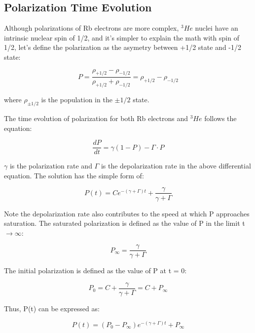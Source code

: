 \subsection{Polarization Time Evolution}

Although polarizations of Rb electrons are more complex, $^{3}He$ nuclei have an intrinsic nuclear spin of 1/2, and it's simpler to explain the math with spin of 1/2, let's define the polarization as the asymetry between +1/2 state and -1/2 state:

\begin{equation}
P=\frac{\rho_{+1/2}-\rho_{-1/2}}{\rho_{+1/2}+\rho_{-1/2}}=\rho_{+1/2}-\rho_{-1/2}
\end{equation}

where $\rho_{\pm 1/2}$ is the population in the $\pm1/2$ state.

The time evolution of polarization for both Rb electrons and $^{3}He$ follows the equation:

\begin{equation}
\frac{dP}{dt}=\gamma(1-P)-\Gamma \cdot P
\end{equation}

$\gamma$ is the polarization rate and $\Gamma$ is the depolarization rate in the above differential equation. The solution has the simple form of:

\begin{equation}
P(t)=Ce^{-(\gamma+\Gamma)t} + \frac{\gamma}{\gamma+\Gamma}
\end{equation}

Note the depolarization rate also contributes to the speed at which P approaches saturation. The saturated polarization is defined as the value of P in the limit t $\rightarrow \infty$:

\begin{equation}
P_{\infty}=\frac{\gamma}{\gamma+\Gamma}
\end{equation}

The initial polarization is defined as the value of P at t = 0:

\begin{equation}
P_{0}=C+\frac{\gamma}{\gamma+\Gamma}=C+P_{\infty}
\end{equation}

Thus, P(t) can be expressed as:

\begin{equation}
P(t)=(P_{0}-P_{\infty})e^{-(\gamma+\Gamma)t}+P_{\infty}
\end{equation}

